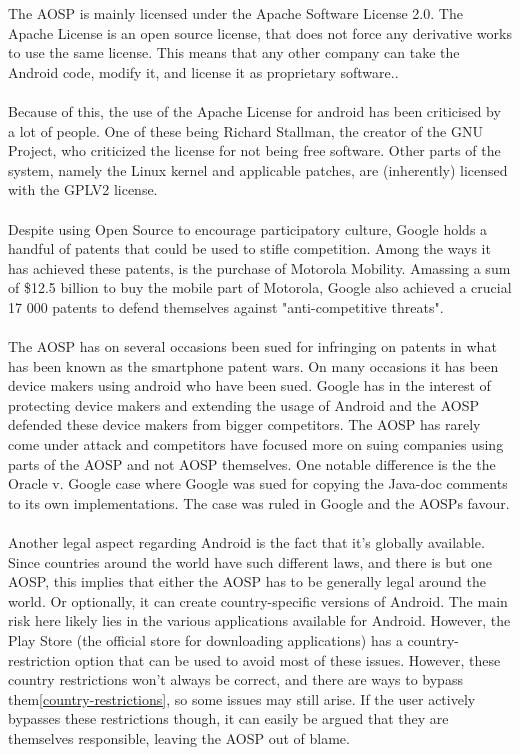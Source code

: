 \documentclass[conference]{IEEEtran}
\begin{document}
The AOSP is mainly licensed under the Apache Software License 2.0. The Apache License is an open source license, that does not force any derivative works to use the same license. This means that any other company can take the Android code, modify it, and license it as proprietary software.\cite{apache-license}. 
\\\\Because of this, the use of the Apache License for android has been criticised by a lot of people. One of these being Richard Stallman, the creator of the GNU Project, who criticized the license for not being free software.\cite{rms-android} Other parts of the system, namely the Linux kernel and applicable patches, are (inherently) licensed with the GPLV2 license.\cite{gplv2}\cite{android-licenses} 
\\\\Despite using Open Source to encourage participatory culture, Google holds a handful of patents that could be used to stifle competition.\cite{google-slide-unlock}\cite{google-radial-menu} Among the ways it has achieved these patents, is the purchase of Motorola Mobility. Amassing a sum of \$12.5 billion to buy the mobile part of Motorola, Google also achieved a crucial 17 000 patents to defend themselves against "anti-competitive threats".\cite{Goggin}
\\\\The AOSP has on several occasions been sued for infringing on patents in what has been known as the smartphone patent wars. On many occasions it has been device makers using android who have been sued.\cite{android-vApple} Google has in the interest of protecting device makers and extending the usage of Android and the AOSP defended these device makers from bigger competitors.\cite{google-helps} The AOSP has rarely come under attack and competitors have focused more on suing companies using parts of the AOSP and not AOSP themselves. One notable difference is the the Oracle v. Google case where Google was sued for copying the Java-doc comments to its own implementations.\cite{android-v-oracle} The case was ruled in Google and the AOSPs favour.
\\\\Another legal aspect regarding Android is the fact that it's globally available. Since countries around the world have such different laws, and there is but one AOSP, this implies that either the AOSP has to be generally legal around the world. Or optionally, it can create country-specific versions of Android. The main risk here likely lies in the various applications available for Android. However, the Play Store (the official store for downloading applications) has a country-restriction option that can be used to avoid most of these issues. However, these country restrictions won't always be correct, and there are ways to bypass them\ref{country-restrictions}, so some issues may still arise. If the user actively bypasses these restrictions though, it can easily be argued that they are themselves responsible, leaving the AOSP out of blame. 
\end{document}

